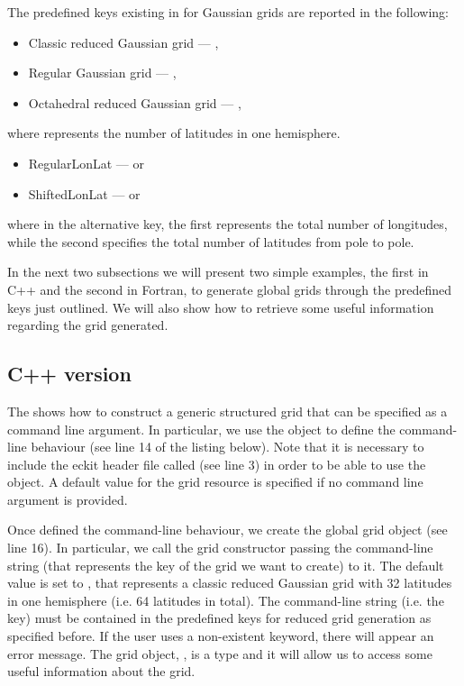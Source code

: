 The predefined keys existing in \Atlas for Gaussian grids 
are reported in the following:
%
\begin{itemize}
\item Classic reduced Gaussian grid --- ,
\item Regular Gaussian grid --- ,
\item Octahedral reduced Gaussian grid --- ,
\end{itemize}
%
where \inltc{\#} represents the number of latitudes 
in one hemisphere.
%
\begin{itemize}
\item RegularLonLat ---  or 
\item ShiftedLonLat ---  or 
\end{itemize}
%
where in the alternative key, the first \inltc{\#} represents the total number 
of longitudes, while the second \inltc{\#} specifies the total number of 
latitudes from pole to pole.

In the next two subsections we will present two simple 
examples, the first in C++ and the second in Fortran, 
to generate global grids through the predefined keys 
just outlined. We will also show how to retrieve some 
useful information regarding the grid generated.

\subsection{C++ version}
The  shows how to construct a generic 
structured grid that can be specified as a command line 
argument. In particular, we use the
 object to define the command-line 
behaviour (see line 14 of the listing below). Note that 
it is necessary to include the eckit header file called 
 (see line 3) in order to be able to 
use the  object. A default value for the grid resource 
is specified if no command line argument is provided.

%

%
Once defined the command-line behaviour, we create the global 
grid object (see line 16). In particular, we call the 
grid constructor passing the command-line string (that 
represents the key of the grid we want to create) to it.
The default value is set to , that represents 
a classic reduced Gaussian grid with 32 latitudes in one hemisphere 
(i.e. 64 latitudes in total).  
The command-line string (i.e. the key) must be contained 
in the predefined keys for reduced grid generation as specified 
before. If the user uses a non-existent keyword, there will 
appear an error message.
The grid object, , is 
a  type and it will allow 
us to access some useful information about the grid.  

